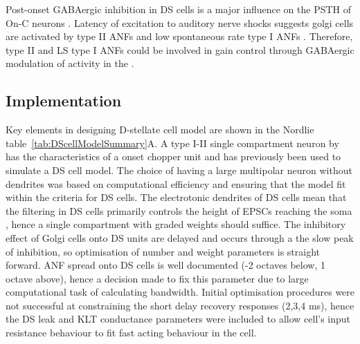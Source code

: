 
Post-onset GABAergic inhibition in DS cells is a major influence on the PSTH of
On-C neurons \citep{FerragamoGoldingEtAl:1998a,EvansZhao:1998}. Latency of
excitation to auditory nerve shocks suggests golgi cells are activated by type
II ANFs and low spontaneous rate type I ANFs \citep{BensonBerglundEtAl:1996,
  FerragamoGoldingEtAl:1998}. Therefore, type II and LS type I ANFs could be
involved in gain control through GABAergic modulation of activity in the \VCN.






\subsection{Implementation}
 
Key elements in designing D-stellate cell model are
shown in the Nordlie table~\ref{tab:DScellModelSummary}A. A type I-II single
compartment neuron by \citet{RothmanManis:2003b} has the characteristics of a
onset chopper unit and has previously been used to simulate a DS cell model. The
choice of having a large multipolar neuron without dendrites was based on
computational efficiency and ensuring that the model fit within the criteria for
DS cells. The electrotonic dendrites of DS cells mean that the filtering in DS
cells primarily controls the height of EPSCs reaching the soma
\citep{WhiteYoungEtAl:1994}, hence a single compartment with graded weights
should suffice. The inhibitory effect of Golgi cells onto DS units are delayed and occurs
through a the slow peak of \GABAa inhibition, so optimisation of number and
weight parameters is straight forward. ANF spread onto DS cells is well
documented (-2 octaves below, 1 octave above), hence a decision made to fix this
parameter due to large computational task of calculating bandwidth. Initial
optimisation procedures were not successful at constraining the short delay
recovery responses (2,3,4 ms), hence the DS leak and KLT conductance parameters
were included to allow cell's input resistance behaviour to fit fast acting
behaviour in the cell.
 

